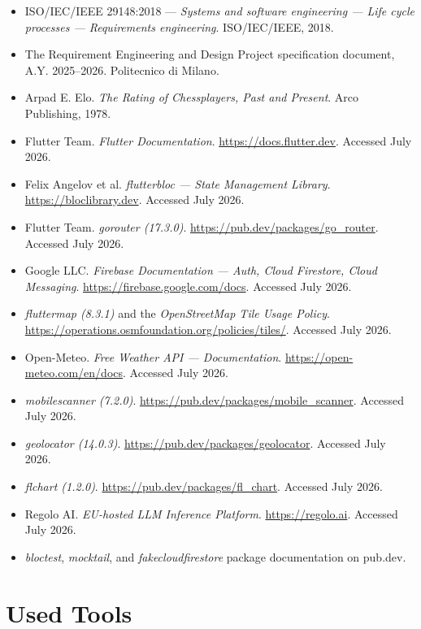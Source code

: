 \documentclass{configurations/polimi3i_thesis}
\renewcommand{\_}{\textunderscore\allowbreak}
\begin{document}
\begin{itemize}
    \item ISO/IEC/IEEE 29148:2018 — \textit{Systems and software engineering — Life cycle processes — Requirements engineering}. ISO/IEC/IEEE, 2018.
    \item The Requirement Engineering and Design Project specification document, A.Y. 2025--2026. Politecnico di Milano.
    \item Arpad E. Elo. \textit{The Rating of Chessplayers, Past and Present}. Arco Publishing, 1978.
    \item Flutter Team. \textit{Flutter Documentation}. \url{https://docs.flutter.dev}. Accessed July 2026.
    \item Felix Angelov et al. \textit{flutter\_bloc — State Management Library}. \url{https://bloclibrary.dev}. Accessed July 2026.
    \item Flutter Team. \textit{go\_router (17.3.0)}. \url{https://pub.dev/packages/go_router}. Accessed July 2026.
    \item Google LLC. \textit{Firebase Documentation — Auth, Cloud Firestore, Cloud Messaging}. \url{https://firebase.google.com/docs}. Accessed July 2026.
    \item \textit{flutter\_map (8.3.1)} and the \textit{OpenStreetMap Tile Usage Policy}. \url{https://operations.osmfoundation.org/policies/tiles/}. Accessed July 2026.
    \item Open-Meteo. \textit{Free Weather API — Documentation}. \url{https://open-meteo.com/en/docs}. Accessed July 2026.
    \item \textit{mobile\_scanner (7.2.0)}. \url{https://pub.dev/packages/mobile_scanner}. Accessed July 2026.
    \item \textit{geolocator (14.0.3)}. \url{https://pub.dev/packages/geolocator}. Accessed July 2026.
    \item \textit{fl\_chart (1.2.0)}. \url{https://pub.dev/packages/fl_chart}. Accessed July 2026.
    \item Regolo AI. \textit{EU-hosted LLM Inference Platform}. \url{https://regolo.ai}. Accessed July 2026.
    \item \textit{bloc\_test}, \textit{mocktail}, and \textit{fake\_cloud\_firestore} package documentation on pub.dev.
\end{itemize}

\section{Used Tools}
\label{sec:used_tools}
\end{document}

